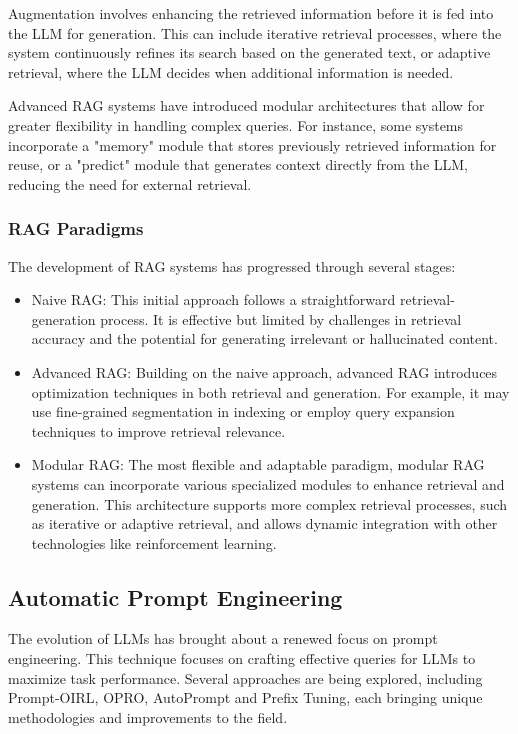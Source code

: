 Augmentation involves enhancing the retrieved information before it is fed into the LLM for generation. This can include iterative retrieval processes, where the system continuously refines its search based on the generated text, or adaptive retrieval, where the LLM decides when additional information is needed.

Advanced RAG systems have introduced modular architectures that allow for greater flexibility in handling complex queries. For instance, some systems incorporate a "memory" module that stores previously retrieved information for reuse, or a "predict" module that generates context directly from the LLM, reducing the need for external retrieval.

\subsubsection{RAG Paradigms}

The development of RAG systems has progressed through several stages:
\begin{itemize}
    \item Naive RAG: This initial approach follows a straightforward retrieval-generation process. It is effective but limited by challenges in retrieval accuracy and the potential for generating irrelevant or hallucinated content.

    \item Advanced RAG: Building on the naive approach, advanced RAG introduces optimization techniques in both retrieval and generation. For example, it may use fine-grained segmentation in indexing or employ query expansion techniques to improve retrieval relevance.

    \item Modular RAG: The most flexible and adaptable paradigm, modular RAG systems can incorporate various specialized modules to enhance retrieval and generation. This architecture supports more complex retrieval processes, such as iterative or adaptive retrieval, and allows dynamic integration with other technologies like reinforcement learning.
\end{itemize}


\subsection{Automatic Prompt Engineering}
\label{sec:autoprompts}
The evolution of LLMs has brought about a renewed focus on prompt engineering. This technique focuses on crafting effective queries for LLMs to maximize task performance. Several approaches are being explored, including Prompt-OIRL, OPRO, AutoPrompt and Prefix Tuning, each bringing unique methodologies and improvements to the field.

